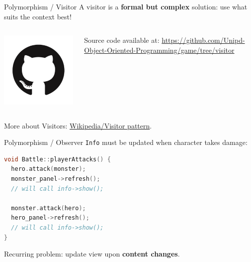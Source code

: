 \documentclass[11pt]{beamer}
\renewcommand{\emph}[1]{\textbf{#1}}
\begin{document}
\begin{frame}{Polymorphism / Visitor}
 A visitor is a \emph{formal but complex} solution: use what suits the context best!
 
 \begin{columns}
  \begin{column}{0.15\textwidth}
   \includegraphics[width=0.99\textwidth]{assets/logo-github}
  \end{column}
  \begin{column}{0.85\textwidth}
   Source code available at:
   \url{https://github.com/Unipd-Object-Oriented-Programming/game/tree/visitor}
  \end{column}
 \end{columns}
 
 More about Visitors: \href{https://en.wikipedia.org/wiki/Visitor_pattern}{Wikipedia/Visitor pattern}.
\end{frame}

\begin{frame}[fragile]{Polymorphism / Observer}
 \texttt{Info} must be updated when character takes damage:
 
 \begin{lstlisting}[language=C++]
void Battle::playerAttacks() {
  hero.attack(monster);
  monster_panel->refresh();
  // will call info->show();
  
  monster.attack(hero);
  hero_panel->refresh();
  // will call info->show();
}
\end{lstlisting}
 
 Recurring problem: update view upon \emph{content changes}.
\end{frame}
\end{document}
